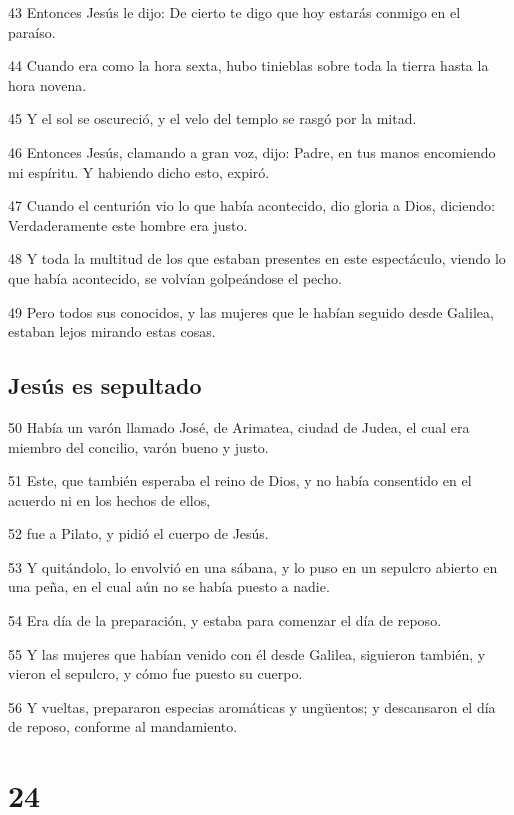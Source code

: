 \par 43 Entonces Jesús le dijo: De cierto te digo que hoy estarás conmigo en el paraíso.
\par 44 Cuando era como la hora sexta, hubo tinieblas sobre toda la tierra hasta la hora novena.
\par 45 Y el sol se oscureció, y el velo del templo se rasgó por la mitad.
\par 46 Entonces Jesús, clamando a gran voz, dijo: Padre, en tus manos encomiendo mi espíritu. Y habiendo dicho esto, expiró.
\par 47 Cuando el centurión vio lo que había acontecido, dio gloria a Dios, diciendo: Verdaderamente este hombre era justo.
\par 48 Y toda la multitud de los que estaban presentes en este espectáculo, viendo lo que había acontecido, se volvían golpeándose el pecho.
\par 49 Pero todos sus conocidos, y las mujeres que le habían seguido desde Galilea, estaban lejos mirando estas cosas.

\section*{Jesús es sepultado}

\par 50 Había un varón llamado José, de Arimatea, ciudad de Judea, el cual era miembro del concilio, varón bueno y justo.
\par 51 Este, que también esperaba el reino de Dios, y no había consentido en el acuerdo ni en los hechos de ellos,
\par 52 fue a Pilato, y pidió el cuerpo de Jesús.
\par 53 Y quitándolo, lo envolvió en una sábana, y lo puso en un sepulcro abierto en una peña, en el cual aún no se había puesto a nadie.
\par 54 Era día de la preparación, y estaba para comenzar el día de reposo.
\par 55 Y las mujeres que habían venido con él desde Galilea, siguieron también, y vieron el sepulcro, y cómo fue puesto su cuerpo.
\par 56 Y vueltas, prepararon especias aromáticas y ungüentos; y descansaron el día de reposo, conforme al mandamiento.

\chapter{24}

